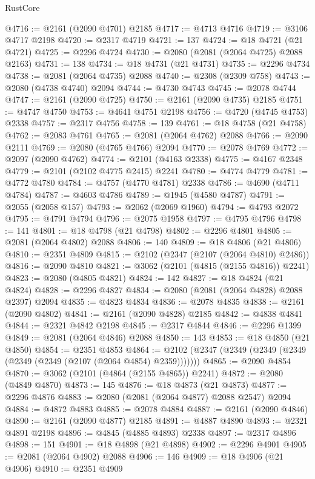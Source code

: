 \begin{lexlean}{RustCore}
\begin{coremodule}
@4716 := @2161 (@2090 @4701) @2185
@4717 := @4713 @4716
@4719 := @3106 @4717 @2198
@4720 := @2317 @4719
@4721 := 137
@4724 := @18 @4721 (@21 @4721)
@4725 := @2296 @4724
@4730 := @2080 (@2081 (@2064 @4725) @2088 @2163)
@4731 := 138
@4734 := @18 @4731 (@21 @4731)
@4735 := @2296 @4734
@4738 := @2081 (@2064 @4735) @2088
@4740 := @2308 (@2309 @758)
@4743 := @2080 (@4738 @4740) @2094
@4744 := @4730 @4743
@4745 := @2078 @4744
@4747 := @2161 (@2090 @4725)
@4750 := @2161 (@2090 @4735) @2185
@4751 := @4747 @4750
@4753 := @4641 @4751 @2198
@4756 := @4720 (@4745 @4753) @2338
@4757 := @2317 @4756
@4758 := 139
@4761 := @18 @4758 (@21 @4758)
@4762 := @2083 @4761
@4765 := @2081 (@2064 @4762) @2088
@4766 := @2090 @2111
@4769 := @2080 (@4765 @4766) @2094
@4770 := @2078 @4769
@4772 := @2097 (@2090 @4762)
@4774 := @2101 (@4163 @2338)
@4775 := @4167 @2348
@4779 := @2101 (@2102 @4775 @2415) @2241
@4780 := @4774 @4779
@4781 := @4772 @4780
@4784 := @4757 (@4770 @4781) @2338
@4786 := @4690 (@4711 @4784)
@4787 := @4603 @4786
@4789 := @1945 (@4580 @4787)
@4791 := @2055 (@2058 @157)
@4793 := @2062 (@2069 @1960)
@4794 := @4793 @2072
@4795 := @4791 @4794
@4796 := @2075 @1958
@4797 := @4795 @4796
@4798 := 141
@4801 := @18 @4798 (@21 @4798)
@4802 := @2296 @4801
@4805 := @2081 (@2064 @4802) @2088
@4806 := 140
@4809 := @18 @4806 (@21 @4806)
@4810 := @2351 @4809
@4815 := @2102 (@2347 (@2107 (@2064 @4810) @2486))
@4816 := @2090 @4810
@4821 := @3062 (@2101 (@4815 (@2155 @4816)) @2241)
@4823 := @2080 (@4805 @4821)
@4824 := 142
@4827 := @18 @4824 (@21 @4824)
@4828 := @2296 @4827
@4834 := @2080 (@2081 (@2064 @4828) @2088 @2397) @2094
@4835 := @4823 @4834
@4836 := @2078 @4835
@4838 := @2161 (@2090 @4802)
@4841 := @2161 (@2090 @4828) @2185
@4842 := @4838 @4841
@4844 := @2321 @4842 @2198
@4845 := @2317 @4844
@4846 := @2296 @1399
@4849 := @2081 (@2064 @4846) @2088
@4850 := 143
@4853 := @18 @4850 (@21 @4850)
@4854 := @2351 @4853
@4864 := @2102 (@2347 (@2349 (@2349 (@2349 (@2349 (@2349 (@2107 (@2064 @4854) @2359)))))))
@4865 := @2090 @4854
@4870 := @3062 (@2101 (@4864 (@2155 @4865)) @2241)
@4872 := @2080 (@4849 @4870)
@4873 := 145
@4876 := @18 @4873 (@21 @4873)
@4877 := @2296 @4876
@4883 := @2080 (@2081 (@2064 @4877) @2088 @2547) @2094
@4884 := @4872 @4883
@4885 := @2078 @4884
@4887 := @2161 (@2090 @4846)
@4890 := @2161 (@2090 @4877) @2185
@4891 := @4887 @4890
@4893 := @2321 @4891 @2198
@4896 := @4845 (@4885 @4893) @2338
@4897 := @2317 @4896
@4898 := 151
@4901 := @18 @4898 (@21 @4898)
@4902 := @2296 @4901
@4905 := @2081 (@2064 @4902) @2088
@4906 := 146
@4909 := @18 @4906 (@21 @4906)
@4910 := @2351 @4909

\end{coremodule}
\end{lexlean}
